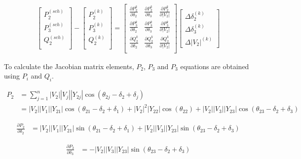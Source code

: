 \documentclass[11pt, oneside, reqno]{amsart}
\numberwithin{equation}{section}
\theoremstyle{plain}%
\theoremstyle{definition}
\theoremstyle{remark}
\begin{document}
\begin{align*}
	\begin{bmatrix}
		P^{(sch)}_2\\
		P^{(sch)}_3\\
		Q^{(sch)}_2\\
	\end{bmatrix}
	-
	\begin{bmatrix}
		P^{(k)}_2\\
		P^{(k)}_3\\
		Q^{(k)}_2\\
	\end{bmatrix}	
	=
	\begin{bmatrix}
		\frac{\partial P_2^k}{\partial\delta_2} & \frac{\partial P_2^k}{\partial \delta_3} & \frac{\partial P_2^k}{\partial |V_2|}\\
		\frac{\partial P_3^k}{\partial\delta_2} & \frac{\partial P_3^k}{\partial \delta_3} & \frac{\partial P_3^k}{\partial |V_2|}\\
		\frac{\partial Q_2^k}{\partial\delta_2} & \frac{\partial Q_2^k}{\partial \delta_3} & \frac{\partial Q_2^k}{\partial |V_2|}\\
	\end{bmatrix}
	\begin{bmatrix}
		\Delta \delta^{(k)}_2\\
		\Delta \delta^{(k)}_3\\
		\Delta |V_2|^{(k)}
	\end{bmatrix}
\end{align*}

To calculate the Jacobian matrix elements, $P_2$, $P_3$ and $P_3$ equations are obtained using $P_i$ and $Q_i$.

\begin{align*}
	P_2&=\sum^n_{j=1}|V_2||V_j||Y_{2j}|\cos(\theta_{2j}-\delta_2+\delta_j)\\
	&=|V_2||V_1||Y_{21}|\cos(\theta_{21}-\delta_2+\delta_1)+|V_2|^2|Y_{22}|\cos(\theta_{22})+|V_2||V_3||Y_{23}|\cos(\theta_{23}-\delta_2+\delta_3)
\end{align*}

\begin{align*}
	\frac{\partial P_2}{\partial\delta_2}&=|V_2||V_1||Y_{21}|\sin(\theta_{21}-\delta_2+\delta_1)+|V_2||V_3||Y_{23}|\sin(\theta_{23}-\delta_2+\delta_3)
\end{align*}

\begin{align*}
	\frac{\partial P_2}{\partial\delta_3}&=-|V_2||V_3||Y_{23}|\sin(\theta_{23}-\delta_2+\delta_3)
\end{align*}
\end{document}
